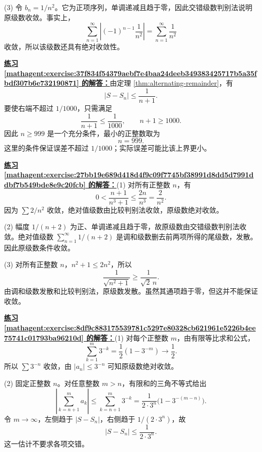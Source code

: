 \documentclass[UTF8,fontset=fandol,11pt]{ctexart}
\begin{document}
(3) 令 $b_n=1/n^2$。它为正项序列，单调递减且趋于零，因此交错级数判别法说明原级数收敛。事实上，
\[
\sum_{n=1}^{\infty}\left|(-1)^{n-1}\frac1{n^2}\right|=\sum_{n=1}^{\infty}\frac1{n^2}
\]
收敛，所以该级数还具有绝对收敛性。\par
\par\noindent\textbf{\hyperref[mathagent:exercise:37f834f54379aebf7e4baa24deeb349383425717b5a35fbdf307b6e732190871]{练习 \ref*{mathagent:exercise:37f834f54379aebf7e4baa24deeb349383425717b5a35fbdf307b6e732190871} 的解答：}}由定理 \ref{thm:alternating-remainder}，有
\[
|S-S_n|\leq\frac{1}{n+1}.
\]
要使右端不超过 $1/1000$，只需满足
\[
\frac{1}{n+1}\leq\frac{1}{1000},
\qquad n+1\geq1000.
\]
因此 $n\geq999$ 是一个充分条件，最小的正整数取为
\[
n=999.
\]
这里的条件保证误差不超过 $1/1000$；实际误差可能比该上界更小。\par
\par\noindent\textbf{\hyperref[mathagent:exercise:27bb19e689d418d4f9c09f7745bf38991d8dd5d7991ddbf7b549bde8e9c20fcb]{练习 \ref*{mathagent:exercise:27bb19e689d418d4f9c09f7745bf38991d8dd5d7991ddbf7b549bde8e9c20fcb} 的解答：}}(1) 对所有正整数 $n$，有
\[
0<\frac{n+1}{n^3+1}\leq\frac{2n}{n^3}=\frac2{n^2}.
\]
因为 $\sum 2/n^2$ 收敛，绝对值级数由比较判别法收敛，原级数绝对收敛。

(2) 幅度 $1/(n+2)$ 为正、单调递减且趋于零，故原级数由交错级数判别法收敛。绝对值级数 $\sum_{n=1}^{\infty}1/(n+2)$ 是调和级数删去前两项所得的尾级数，发散。因此原级数条件收敛。

(3) 对所有正整数 $n$，$n^2+1\leq2n^2$，所以
\[
\frac1{\sqrt{n^2+1}}\geq\frac1{\sqrt2\,n}.
\]
由调和级数发散和比较判别法，原级数发散。虽然其通项趋于零，但这并不能保证收敛。\par
\par\noindent\textbf{\hyperref[mathagent:exercise:8df9c883175539781c5297e80328cb621961e5226b4ee75741c01793ba96210d]{练习 \ref*{mathagent:exercise:8df9c883175539781c5297e80328cb621961e5226b4ee75741c01793ba96210d} 的解答：}}(1) 对每个正整数 $m$，由有限等比求和公式，
\[
\sum_{k=1}^{m}3^{-k}=\frac12(1-3^{-m})\longrightarrow\frac12.
\]
所以 $\sum 3^{-n}$ 收敛，由 $|a_n|\leq3^{-n}$ 可知原级数绝对收敛。

(2) 固定正整数 $n$。对任意整数 $m>n$，有限和的三角不等式给出
\[
\left|\sum_{k=n+1}^{m}a_k\right|
\leq\sum_{k=n+1}^{m}3^{-k}
=\frac{1}{2\cdot3^n}\bigl(1-3^{-(m-n)}\bigr).
\]
令 $m\to\infty$，左侧趋于 $|S-S_n|$，右侧趋于 $1/(2\cdot3^n)$，故
\[
|S-S_n|\leq\frac1{2\cdot3^n}.
\]
这一估计不要求各项交错。
\end{document}

